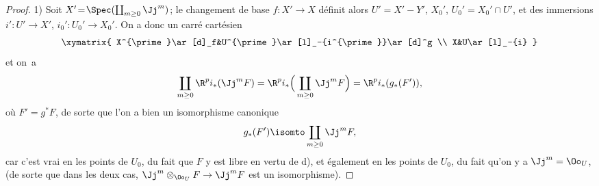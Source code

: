 \begin{proof}
1) Soit $X'\!=\!\Spec(\coprod_{m\geq 0}\Jj^m)$; le changement de base \hbox{$f:X'\!\to\! X$} d\'efinit alors $U'=X'- Y'$, $X_0'$, $U_0'=X_0'\cap U'$, et des immersions $i':U'\to X'$, \hbox{$i_0':U_0'\to X_0'$}. On a donc un carr\'e cart\'esien
\[
\xymatrix{
X^{\prime}\ar[d]_f&U^{\prime}\ar[l]_-{i^{\prime}}\ar[d]^g \\
X&U\ar[l]_-{i}
}
\]
et on~a
\steco
\begin{equation} \label{eq:XII.19}
\coprod_{m\geq 0}\R^pi_\ast(\Jj^mF) = \R^pi_\ast \Big(\coprod_{m\geq 0} \Jj^mF \Big) =\R^pi_\ast (g_\ast(F')),
\end{equation}
o\`u $F'=g^\ast F$, de sorte que l'on a bien un isomorphisme canonique
\[
g_\ast(F') \isomto \coprod_{m\geq 0}\Jj^mF,
\]
car c'est vrai en les points de $U_0$, du fait que $F$ y est libre en vertu de d), et \'egalement en les points de $U_0$, du fait qu'on y a $\Jj^m=\Oo_U$, (de sorte que dans les deux cas, $\Jj^m\otimes_{\Oo_U}F\to \Jj^mF$ est un isomorphisme).


\end{proof}

